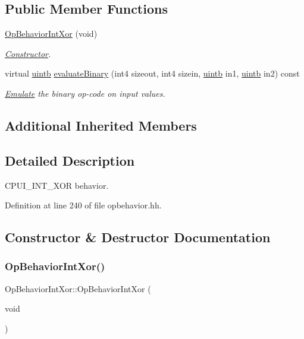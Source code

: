 \subsection*{Public Member Functions}
\begin{DoxyCompactItemize}
\item 
\mbox{\hyperlink{class_op_behavior_int_xor_ae46e24ce1dbe851cca97d1e8df045980}{Op\+Behavior\+Int\+Xor}} (void)
\begin{DoxyCompactList}\small\item\em \mbox{\hyperlink{class_constructor}{Constructor}}. \end{DoxyCompactList}\item 
virtual \mbox{\hyperlink{types_8h_a2db313c5d32a12b01d26ac9b3bca178f}{uintb}} \mbox{\hyperlink{class_op_behavior_int_xor_a35c4fc54f6fa0207e28e1e5612abe4cc}{evaluate\+Binary}} (int4 sizeout, int4 sizein, \mbox{\hyperlink{types_8h_a2db313c5d32a12b01d26ac9b3bca178f}{uintb}} in1, \mbox{\hyperlink{types_8h_a2db313c5d32a12b01d26ac9b3bca178f}{uintb}} in2) const
\begin{DoxyCompactList}\small\item\em \mbox{\hyperlink{class_emulate}{Emulate}} the binary op-\/code on input values. \end{DoxyCompactList}\end{DoxyCompactItemize}
\subsection*{Additional Inherited Members}


\subsection{Detailed Description}
C\+P\+U\+I\+\_\+\+I\+N\+T\+\_\+\+X\+OR behavior. 

Definition at line 240 of file opbehavior.\+hh.



\subsection{Constructor \& Destructor Documentation}
\mbox{\label{class_op_behavior_int_xor_ae46e24ce1dbe851cca97d1e8df045980}} 
\subsubsection{\texorpdfstring{OpBehaviorIntXor()}{OpBehaviorIntXor()}}
{\footnotesize\ttfamily Op\+Behavior\+Int\+Xor\+::\+Op\+Behavior\+Int\+Xor (\begin{DoxyParamCaption}\item[{void}]{ }\end{DoxyParamCaption})\hspace{0.3cm}{\ttfamily [inline]}}



